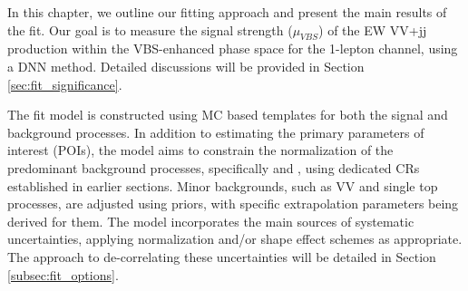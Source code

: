 \label{ch:stat_interpretation}

In this chapter, we outline our fitting approach and present the main results of the fit. 
Our goal is to measure the signal strength ($\mu_{VBS}$) of the EW VV+jj production within the VBS-enhanced phase space for the 1-lepton channel, 
using a DNN method. 
Detailed discussions will be provided in Section \ref{sec:fit_significance}.

The fit model is constructed using MC based templates for both the signal and background processes. 
In addition to estimating the primary parameters of interest (POIs), the model aims to constrain the normalization of the predominant background processes, specifically \Wjets and \ttbar, using dedicated CRs established in earlier sections. 
Minor backgrounds, such as VV and single top processes, are adjusted using priors, with specific extrapolation parameters being derived for them. 
The model incorporates the main sources of systematic uncertainties, applying normalization and/or shape effect schemes as appropriate. 
The approach to de-correlating these uncertainties will be detailed in Section \ref{subsec:fit_options}.



  
  
  


